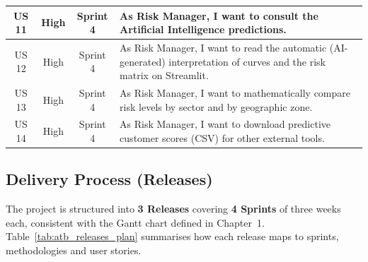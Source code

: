 \begin{table}[H]
\begin{tabularx}{\textwidth}{|c|c|c|X|}
US 11 & High & Sprint 4 &
As Risk Manager, I want to consult the Artificial Intelligence predictions. \\
\hline

US 12 & High & Sprint 4 &
As Risk Manager, I want to read the automatic (AI-generated) interpretation of curves and the risk matrix on Streamlit. \\
\hline

US 13 & High & Sprint 4 &
As Risk Manager, I want to mathematically compare risk levels by sector and by geographic zone. \\
\hline

US 14 & High & Sprint 4 &
As Risk Manager, I want to download predictive customer scores (CSV) for other external tools. \\
\hline

\end{tabularx}
\end{table}

\clearpage
\subsection{Delivery Process (Releases)}

The project is structured into \textbf{3 Releases} covering \textbf{4 Sprints} of three
weeks each, consistent with the Gantt chart defined in Chapter~1.
Table~\ref{tab:atb_releases_plan} summarises how each release maps to sprints,
methodologies and user stories.

